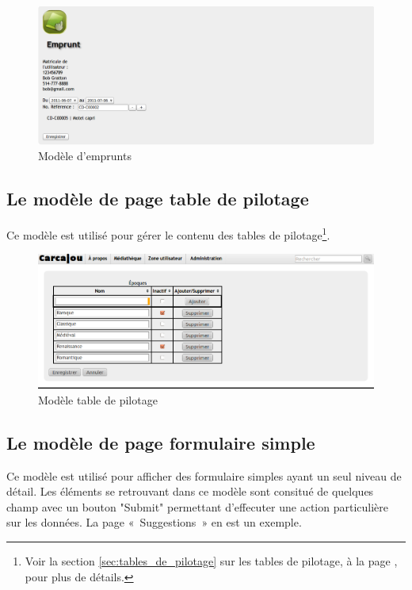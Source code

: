 \documentclass[letter, 11pt]{report}
\begin{document}
\begin{figure}[htbp]
	\begin{center}
		\includegraphics[scale=0.25]{captures_ecran/emprunt.png}
	\end{center}
	\caption{Modèle d'emprunts}
\end{figure}

\subsection{Le modèle de page table de pilotage}

Ce modèle est utilisé pour gérer le contenu des tables de pilotage\footnote{Voir la section \ref{sec:tables_de_pilotage} sur les tables de pilotage, à la page \pageref{sec:tables_de_pilotage}, pour plus de détails.}.

\begin{figure}[htbp]
	\begin{center}
		\includegraphics[scale=0.4]{captures_ecran/modele_tables_de_pilotage.png}
	\end{center}
	\caption{Modèle table de pilotage}
\end{figure}

\subsection{Le modèle de page formulaire simple}

Ce modèle est utilisé pour afficher des formulaire simples ayant un seul niveau de détail. Les éléments se retrouvant dans ce modèle sont consitué de quelques champ avec un bouton "Submit" permettant d'effecuter une action particulière sur les données. La page «~Suggestions~» en est un exemple.
\end{document}
